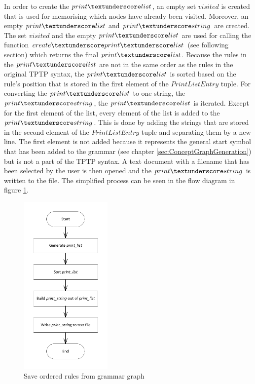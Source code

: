 In order to create the $print\textunderscore list$, an empty set $visited$ is created that is used for memorising which nodes have already been visited. Moreover, an empty $print\textunderscore list$ and $print\textunderscore string$ are created. The set $visited$ and the empty $print\textunderscore list$ are used for calling the function $create\textunderscore print\textunderscore list$ (see following section) which returns the final $print\textunderscore list$. Because the rules in the $print\textunderscore list$ are not in the same order as the rules in the original \ac{TPTP} syntax, the $print\textunderscore list$ is sorted based on the rule's position that is stored in the first element of the $PrintListEntry$ tuple. For converting the $print\textunderscore list$ to one string, the $print\textunderscore string$, the $print\textunderscore list$ is iterated. Except for the first element of the list, every element of the list is added to the $print\textunderscore string$. This is done by adding the strings that are stored in the second element of the $PrintListEntry$ tuple and separating them by a new line. The first element is not added because it represents the general start symbol that has been added to the grammar (see chapter \ref{sec:ConceptGraphGeneration}) but is not a part of the \ac{TPTP} syntax. A text document with a filename that has been selected by the user is then opened and the $print\textunderscore string$ is written to the file.
The simplified process can be seen in the flow diagram in figure \ref{fig:ImplementationOutputSaveOrderedRules}.

\begin{figure}[H]
\centering
\includegraphics[width=0.4\textwidth]{images/Implementation_saveorderedrules.pdf}
\caption{Save ordered rules from grammar graph}
\label{fig:ImplementationOutputSaveOrderedRules}
\end{figure}

